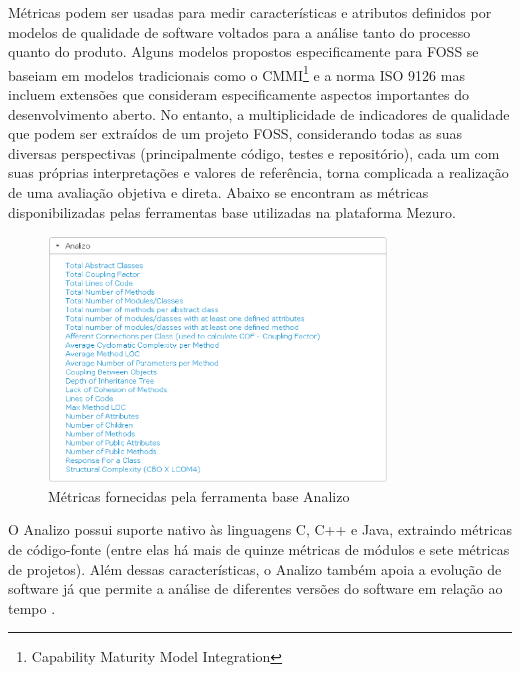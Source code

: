 Métricas podem ser usadas para medir características e atributos definidos por modelos de qualidade de software voltados para a análise tanto do processo quanto do produto. Alguns modelos propostos especificamente para FOSS se baseiam em modelos tradicionais como o CMMI\footnote{Capability Maturity Model Integration}\cite{paulk1994capability} e a norma ISO 9126\cite{iso2003iec} mas incluem extensões que consideram especificamente aspectos importantes do desenvolvimento aberto. No entanto, a multiplicidade de indicadores de qualidade que podem ser extraídos de um projeto FOSS, considerando todas as suas diversas perspectivas (principalmente código, testes e repositório), cada um com suas próprias interpretações e valores de referência, torna complicada a realização de uma avaliação objetiva e direta. Abaixo se encontram as métricas disponibilizadas pelas ferramentas base utilizadas na plataforma Mezuro.

\graphicspath{{figuras/}}
\begin{figure}[H]
\centering
\includegraphics[width=0.8\textwidth]{analizo_bt}
\caption{Métricas fornecidas pela ferramenta base Analizo}
\label{fig-analizo_bt}
\end{figure}

O Analizo possui suporte nativo às linguagens C, C++ e Java, extraindo métricas de código-fonte (entre elas há mais de quinze métricas de módulos e sete métricas de projetos). Além dessas características, o Analizo também apoia a evolução de software já que permite a análise de diferentes versões do software em relação ao tempo .

